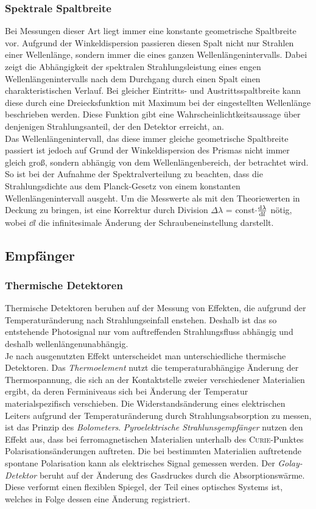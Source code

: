 \documentclass[a4paper,twoside,final]{article}
\begin{document}
\subsubsection{Spektrale Spaltbreite}
Bei Messungen dieser Art liegt immer eine konstante geometrische Spaltbreite vor. Aufgrund der Winkeldispersion passieren diesen Spalt nicht nur Strahlen einer Wellenlänge, sondern immer die eines ganzen Wellenlängenintervalls. Dabei zeigt die Abhängigkeit der spektralen Strahlungsleistung eines engen Wellenlängenintervalls nach dem Durchgang durch einen Spalt einen charakteristischen Verlauf. Bei gleicher Eintritts- und Austrittsspaltbreite kann diese durch eine Dreiecksfunktion mit Maximum bei der eingestellten Wellenlänge beschrieben werden. Diese Funktion gibt eine Wahrscheinlichtkeitsaussage über denjenigen Strahlungsanteil, der den Detektor erreicht, an. \\
Das Wellenlängenintervall, das diese immer gleiche geometrische Spaltbreite passiert ist jedoch auf Grund der Winkeldispersion des Prismas nicht immer gleich groß, sondern abhängig von dem Wellenlängenbereich, der betrachtet wird. So ist bei der Aufnahme der Spektralverteilung zu beachten, dass die Strahlungsdichte aus dem Planck-Gesetz von einem konstanten Wellenlängenintervall ausgeht. Um die Messwerte als mit den Theoriewerten in Deckung zu bringen, ist eine Korrektur durch Division $\Delta \lambda$ = const$\cdot \dv{\lambda}{l}$ nötig, wobei $\dd{l}$ die infinitesimale Änderung der Schraubeneinstellung darstellt.

\subsection{Empfänger}\label{sec:Empfänger)}
\subsubsection{Thermische Detektoren}
Thermische Detektoren beruhen auf der Messung von Effekten, die aufgrund der Temperaturänderung nach Strahlungseinfall enstehen. Deshalb ist das so entstehende Photosignal nur vom auftreffenden Strahlungsfluss abhängig und deshalb wellenlängenunabhängig. \\
Je nach ausgenutzten Effekt unterscheidet man unterschiedliche thermische Detektoren. Das \emph{Thermoelement} nutzt die temperaturabhängige Änderung der Thermospannung, die sich an der Kontaktstelle zweier verschiedener Materialien ergibt, da deren Ferminiveaus sich bei Änderung der Temperatur materialspezifisch verschieben.
Die Widerstandsänderung eines elektrischen Leiters aufgrund der Temperaturänderung durch Strahlungsabsorption zu messen, ist das Prinzip des \emph{Bolometers}.
\emph{Pyroelektrische Strahlunsgempfänger} nutzen den Effekt aus, dass bei ferromagnetischen Materialien unterhalb des \textsc{Curie}-Punktes Polarisationsänderungen auftreten. Die bei bestimmten Materialien auftretende spontane Polarisation kann als elektrisches Signal gemessen werden. Der \emph{Golay-Detektor} beruht auf der Änderung des Gasdruckes durch die Absorptionswärme. Diese verformt einen flexiblen Spiegel, der Teil eines optisches Systems ist, welches in Folge dessen eine Änderung registriert.
\end{document}
